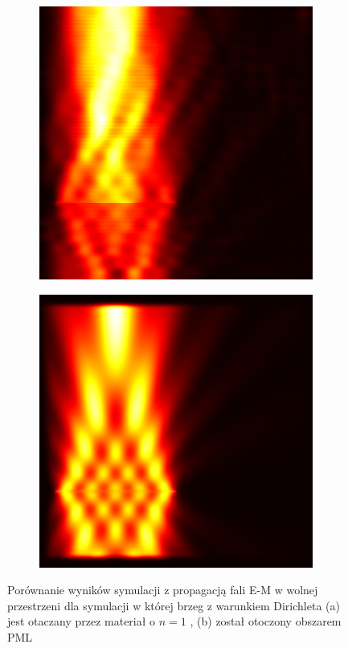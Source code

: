 \begin{figure}[tb]
	\begin{subfigure}{0.45\textwidth}
		\includegraphics[width=\textwidth]{images/wstep/SUM-nopml-energy.png}
		\caption{}
		\label{fig:wstep-pml-bad}
	\end{subfigure}
	\begin{subfigure}{0.45\textwidth}
		\includegraphics[width=\textwidth]{images/wstep/SUM-pml-energy.png}
		\caption{}
	\end{subfigure}
	\caption{Porównanie wyników symulacji z propagacją fali E-M w wolnej przestrzeni dla symulacji w której brzeg z warunkiem Dirichleta (a) jest otaczany przez materiał o $n=1$ , (b) został otoczony obszarem PML}
\end{figure}


